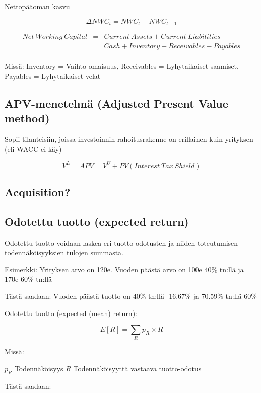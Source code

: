 \documentclass[a4paper]{article}
\begin{document}
Nettopääoman kasvu

\[ \Delta NWC_t = NWC_t - NWC_{t-1} \]

\[
\begin{array}{lcl}
Net\ Working\ Capital & = & Current\ Assets + Current\ Liabilities \\
 & = & Cash + Inventory + Receivables - Payables \\
\end{array}
\]

Missä: Inventory = Vaihto-omaisuus, Receivables = Lyhytaikaiset saamiset, Payables = Lyhytaikaiset velat

\subsection{APV-menetelmä (Adjusted Present Value method)}

Sopii tilanteisiin, joissa investoinnin rahoitusrakenne on erillainen kuin yrityksen (eli WACC ei käy)

\[ V^L = APV = V^U + PV(Interest\ Tax\ Shield) \]

\subsection{Acquisition?}


\subsection{Odotettu tuotto (expected return)}

Odotettu tuotto voidaan laskea eri tuotto-odotusten ja niiden toteutumisen todennäköisyyksien tulojen summasta.

Esimerkki: Yrityksen arvo on 120e. Vuoden päästä arvo on 100e 40\% tn:llä ja 170e 60\% tn:llä

Tästä saadaan: Vuoden päästä tuotto on 40\% tn:llä -16.67\% ja 70.59\% tn:llä 60\%

Odotettu tuotto (expected (mean) return):

\[
E[R] = \sum_R{p_R \times R}
\]

Missä:

$p_R$ \quad Todennäköisyys
$R$ \quad Todennäköisyyttä vastaava tuotto-odotus

Tästä saadaan:
\end{document}
